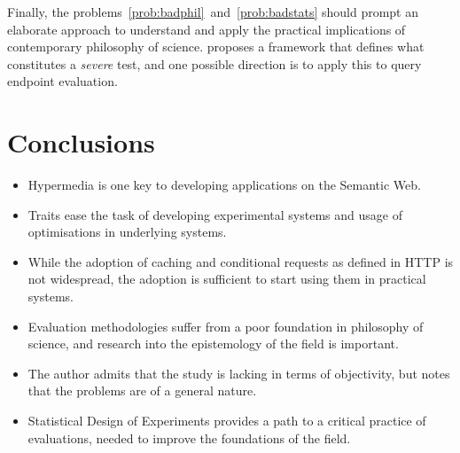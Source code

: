 Finally, the problems~\ref{prob:badphil}~and~\ref{prob:badstats}
should prompt an elaborate approach to understand and apply the
practical implications of contemporary philosophy of
science. \cite{Mayo2005-MAYEAP} proposes a framework that defines what
constitutes a \emph{severe} test, and one possible direction is to
apply this to query endpoint evaluation.

\section{Conclusions}\label{sec:conclusions}

\begin{itemize}
\item Hypermedia is one key to developing applications on the Semantic
  Web.
\item Traits ease the task of developing experimental systems and
  usage of optimisations in underlying systems.
\item While the adoption of caching and conditional requests as defined
  in HTTP is not widespread, the adoption is sufficient to start using
  them in practical systems.
\item Evaluation methodologies suffer from a poor foundation in
  philosophy of science, and research into the epistemology of the
  field is important.
\item The author admits that the study is lacking in terms of
  objectivity, but notes that the problems are of a general nature.
\item Statistical Design of Experiments provides a path to a critical
  practice of evaluations, needed to improve the foundations of the
  field.
\end{itemize}
